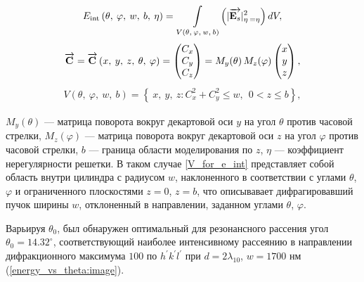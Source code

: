     \begin{align}
        E_{\textrm{int}} \left(\theta,\:\varphi, \:w, \:b, \:\eta\right) = \mathop{\int}\limits_{V\left(\theta,\:\varphi, \:w, \:b\right)} \left( |\overrightarrow{\textbf{E}_{s}}|^2_{\eta \:= \eta} \right) dV,
        \label{e_int}
    \end{align}
    \begin{align}
        \overrightarrow{\textbf{C}_{}} = \overrightarrow{\textbf{C}_{}}\left(x,\:y,\:z,\:\theta,\:\varphi \right) = \begin{pmatrix}C_{x}\\C_{y}\\C_{z}\end{pmatrix} = M_y(\theta)\,M_z(\varphi)\begin{pmatrix}x\\y\\z\end{pmatrix},
        \label{c_for_e_int}
    \end{align}
    \begin{align}
        V\left(\theta,\:\varphi, \:w, \:b \right) = \left\{\:x,\:y,\:z : C_{x}^2 + C_{y}^2 \leq w, \:\: 0 < z \leq b \right\},
        \label{V_for_e_int}
    \end{align}

 $M_y(\theta)$ --- матрица поворота вокруг декартовой оси $y$ на угол $\theta$ против часовой стрелки, $M_z(\varphi)$ --- матрица поворота вокруг декартовой оси $z$ на угол $\varphi$ против часовой стрелки, $b$ --- граница области моделирования по $z$, $\eta$ --- коэффициент нерегулярности решетки. В таком случае \autoref{V_for_e_int} представляет собой область внутри цилиндра с радиусом $w$, наклоненного в соответствии с углами $\theta$, $\varphi$ и ограниченного плоскостями $z = 0$, $z = b$, что описывавает дифрагировавший пучок ширины $w$, отклоненный в направлении, заданном углами $\theta$, $\varphi$.

Варьируя $\theta_0$, был обнаружен оптимальный для резонансного рассения угол $\theta_0 = 14.32^{\circ}$, соответствующий наиболее интенсивному рассеянию в направлении дифракционного максимума $100$ по $h^\prime k^\prime l^\prime$ при $d = 2\lambda_{10}$, $w = 1700$ нм (\autoref{energy_vs_theta:image}).

